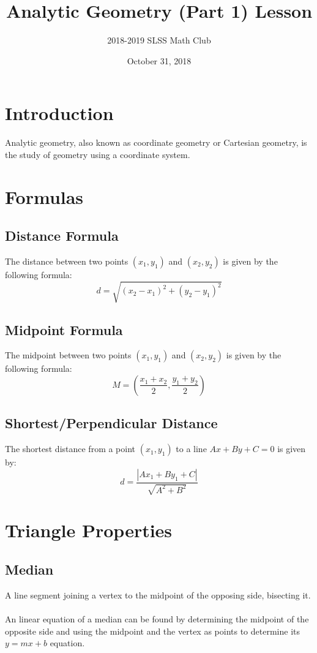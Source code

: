 \documentclass[12pt]{article}
\title{Analytic Geometry (Part 1) Lesson\vspace{-3mm}}
\author{2018-2019 SLSS Math Club\vspace{-5mm}}
\date{October 31, 2018\vspace{-5mm}}
\begin{document}
\maketitle
\section{Introduction}
Analytic geometry, also known as coordinate geometry or Cartesian geometry, is the study of geometry using a coordinate system.

\section{Formulas}
\subsection{Distance Formula}
The distance between two points $(x_1, y_1)$ and $(x_2, y_2)$ is given by the following formula:
\begin{equation*}
    d = \sqrt{(x_2 - x_1)^2 + (y_2 - y_1)^2}
\end{equation*}

\subsection{Midpoint Formula}
The midpoint between two points $(x_1, y_1)$ and $(x_2, y_2)$ is given by the following formula:
\begin{equation*}
    M = (\frac{x_1 + x_2}{2}, \frac{y_1 + y_2}{2})
\end{equation*}

\subsection{Shortest/Perpendicular Distance}
The shortest distance from a point $(x_1, y_1)$ to a line $Ax + By + C = 0$ is given by:
\begin{equation*}
    d = \frac{|Ax_1 + By_1 + C|}{\sqrt{A^2 + B^2}}
\end{equation*}

\section{Triangle Properties}
\subsection{Median}
A line segment joining a vertex to the midpoint of the opposing side, bisecting it. \\ \\
An linear equation of a median can be found by determining the midpoint of the opposite side and using the midpoint and the vertex as points to determine its $y = mx + b$ equation.
\end{document}
